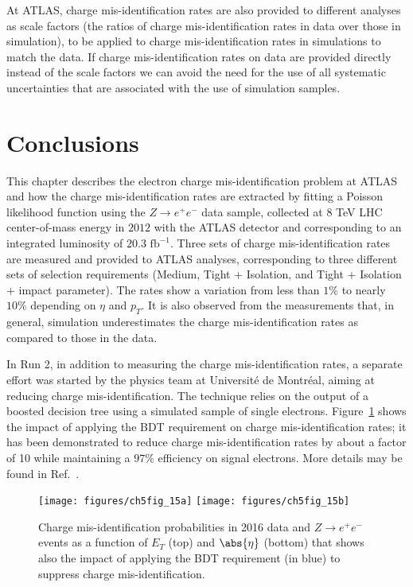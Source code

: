 At ATLAS, charge mis-identification rates are also provided to different
analyses as scale factors (the ratios of charge mis-identification rates in
data over those in simulation), to be applied to charge mis-identification
rates in simulations to match the data. If charge mis-identification rates on
data are provided directly instead of the scale factors we can avoid the need
for the use of all systematic uncertainties that are associated with the use of
simulation samples.


\section{Conclusions}\label{s:chargecon}

This chapter describes the electron charge mis-identification problem at ATLAS
and how the charge mis-identification rates are extracted by fitting a Poisson
likelihood function using the $Z\to e^+e^-$ data sample, collected at $8$ TeV
LHC center-of-mass energy in $2012$ with the ATLAS detector and corresponding
to an integrated luminosity of $20.3$ $\text{fb}^{-1}$. Three sets of charge
mis-identification rates are measured and provided to ATLAS analyses,
corresponding to three different sets of selection requirements (Medium, Tight
+ Isolation, and Tight + Isolation + impact parameter). The rates show a
variation from less than $1\%$ to nearly $10\%$ depending on $\eta$ and $p_T$.
It is also observed from the measurements that, in general, simulation
underestimates the charge mis-identification rates as compared to those in the
data.

In Run 2, in addition to measuring the charge mis-identification rates, a
separate effort was started by the physics team at Universit\'{e} de
Montr\'{e}al, aiming at reducing charge mis-identification. The technique
relies on the output of a boosted decision tree using a simulated sample of
single electrons. Figure~\ref{f:meeratesbdt} shows the impact of applying the
BDT requirement on charge mis-identification rates; it has been demonstrated to
reduce charge mis-identification rates by about a factor of 10 while
maintaining a $97\%$ efficiency on signal electrons. More details may be found
in Ref.~\cite{atlaselcid}.

\begin{figure}[H]
	\texttt{[image: figures/ch5fig\_15a]}
	\texttt{[image: figures/ch5fig\_15b]}
	\centering

	\caption{Charge mis-identification probabilities in 2016 data and $Z\to e^+e^-$
		events as a function of $E_T$ (top) and $\abs{\eta}$ (bottom) that shows also
		the impact of applying the BDT requirement (in blue) to suppress charge mis-identification.
	}

	\label{f:meeratesbdt}
\end{figure}
